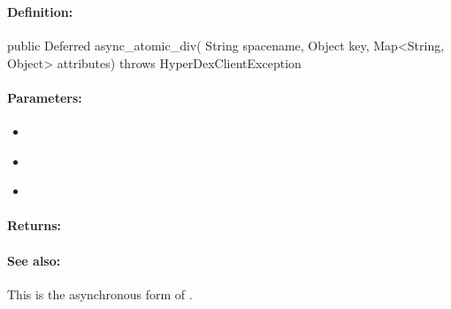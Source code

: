 \pagebreak
\subsubsection{}
\label{api:java:async_atomic_div}


\paragraph{Definition:}
\begin{javacode}
public Deferred async_atomic_div(
        String spacename,
        Object key,
        Map<String, Object> attributes) throws HyperDexClientException
\end{javacode}

\paragraph{Parameters:}
\begin{itemize}[noitemsep]
\item {}\\

\item {}\\

\item {}\\

\end{itemize}

\paragraph{Returns:}


\paragraph{See also:}  This is the asynchronous form of .

\pagebreak
\subsubsection{}
\label{api:java:cond_atomic_div}


